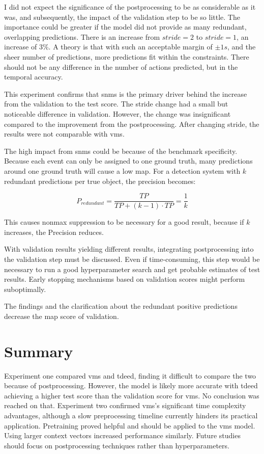 I did not expect the significance of the postprocessing to be as considerable as it was, and subsequently, the impact of the validation step to be so little. The importance could be greater if the model did not provide as many redundant, overlapping predictions. There is an increase from $stride=2$ to $stride=1$, an increase of $3\%$. A theory is that with such an acceptable margin of $\pm1s$, and the sheer number of predictions, more predictions fit within the constraints. There should not be any difference in the number of actions predicted, but in the temporal accuracy. 

This experiment confirms that \acrshort{snms} is the primary driver behind the increase from the validation to the test score. The stride change had a small but noticeable difference in validation. However, the change was insignificant compared to the improvement from the postprocessing. After changing stride, the results were not comparable with \acrshort{vms}. 

The high impact from \acrshort{snms} could be because of the benchmark specificity. Because each event can only be assigned to one ground truth, many predictions around one ground truth will cause a low \acrlong{map}. For a detection system with $k$ redundant predictions per true object, the precision becomes:

\[P_{redundant} = \frac{TP}{TP + (k-1) \cdot TP} = \frac{1}{k}\]

This causes nonmax suppression to be necessary for a good result, because if $k$ increases, the Precision reduces.  

With validation results yielding different results, integrating postprocessing into the validation step must be discussed. Even if time-consuming, this step would be necessary to run a good hyperparameter search and get probable estimates of test results. Early stopping mechanisms based on validation scores might perform suboptimally. 

The findings and the clarification about the redundant positive predictions decrease the \acrshort{map} score of validation.

\section{Summary}

Experiment one compared \acrfull{vms} and \acrfull{tdeed}, finding it difficult to compare the two because of postprocessing. However, the model is likely more accurate with \acrshort{tdeed} achieving a higher test score than the validation score for \acrshort{vms}. No conclusion was reached on that. Experiment two confirmed \acrshort{vms}'s significant time complexity advantages, although a slow preprocessing timeline currently hinders its practical application. Pretraining proved helpful and should be applied to the \acrshort{vms} model. Using larger context vectors increased performance similarly. Future studies should focus on postprocessing techniques rather than hyperparameters. 